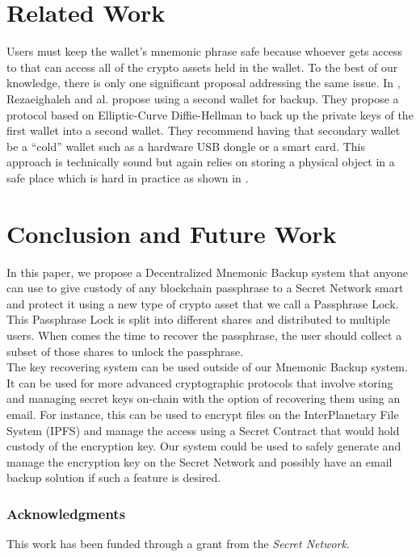 \documentclass[runningheads]{llncs}
\begin{document}
\section{Related Work}

Users must keep the wallet's mnemonic phrase safe because whoever gets access to that can access all of the crypto assets held in the wallet. To the best of our knowledge, there is only one significant proposal addressing the same issue. In \cite{rezaeighaleh2019new}, Rezaeighaleh and al. propose using a second wallet for backup. They propose a protocol based on Elliptic-Curve Diffie-Hellman to back up the private keys of the first wallet into a second wallet. They recommend having that secondary wallet be a ``cold'' wallet such as a hardware USB dongle or a smart card. This approach is technically sound but again relies on storing a physical object in a safe place which is hard in practice as shown in \cite{voskobojnikov2021u}. 

\section{Conclusion and Future Work}

In this paper, we propose a Decentralized Mnemonic Backup system that anyone can use to give custody of any blockchain passphrase to a Secret Network smart and protect it using a new type of crypto asset that we call a Passphrase Lock. This Passphrase Lock is split into different shares and distributed to multiple users. When comes the time to recover the passphrase, the user should collect a subset of those shares to unlock the passphrase. \\

The key recovering system can be used outside of our Mnemonic Backup system. It can be used for more advanced cryptographic protocols that involve storing and managing secret keys on-chain with the option of recovering them using an email. For instance, this can be used to encrypt files on the InterPlanetary File System
(IPFS) \cite{muralidharan2019interplanetary} and manage the access using a Secret Contract that would hold custody of the encryption key. Our system could be used to safely generate and manage the encryption key on the Secret Network and possibly have an email backup solution if such a feature is desired.  

\subsubsection{Acknowledgments} This work has been funded through a grant from the {\em Secret Network}.



\end{document}
